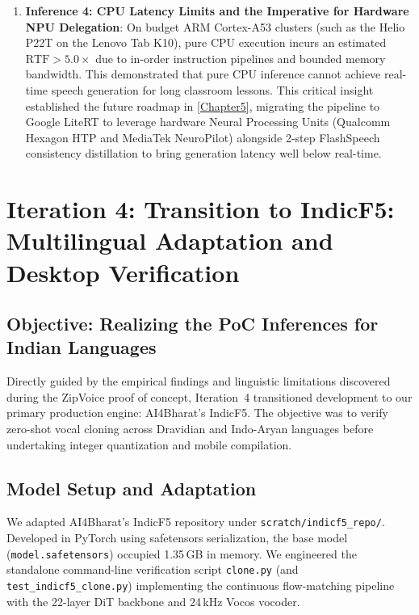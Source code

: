 \begin{enumerate}
    \item \textbf{Inference 4: CPU Latency Limits and the Imperative for Hardware NPU Delegation}:
    On budget ARM Cortex-A53 clusters (such as the Helio P22T on the Lenovo Tab K10), pure CPU execution incurs an estimated $\text{RTF} > 5.0\times$ due to in-order instruction pipelines and bounded memory bandwidth. This demonstrated that pure CPU inference cannot achieve real-time speech generation for long classroom lessons. This critical insight established the future roadmap in \cref{Chapter5}, migrating the pipeline to Google LiteRT to leverage hardware Neural Processing Units (Qualcomm Hexagon HTP and MediaTek NeuroPilot) alongside 2-step FlashSpeech consistency distillation to bring generation latency well below real-time.
\end{enumerate}

\section{Iteration 4: Transition to IndicF5: Multilingual Adaptation and Desktop Verification}
\subsection{Objective: Realizing the PoC Inferences for Indian Languages}
Directly guided by the empirical findings and linguistic limitations discovered during the ZipVoice proof of concept, Iteration~4 transitioned development to our primary production engine: AI4Bharat's IndicF5. The objective was to verify zero-shot vocal cloning across Dravidian and Indo-Aryan languages before undertaking integer quantization and mobile compilation.

\subsection{Model Setup and Adaptation}
We adapted AI4Bharat's IndicF5 repository under \texttt{scratch/indicf5\_repo/}. Developed in PyTorch using safetensors serialization, the base model (\texttt{model.safetensors}) occupied 1.35\,GB in memory. We engineered the standalone command-line verification script \texttt{clone.py} (and \texttt{test\_indicf5\_clone.py}) implementing the continuous flow-matching pipeline with the 22-layer DiT backbone and 24\,kHz Vocos vocoder.

